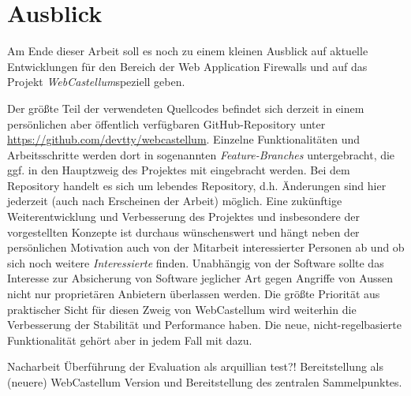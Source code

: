 


\section{Ausblick}

Am Ende dieser Arbeit soll es noch zu einem kleinen Ausblick auf aktuelle Entwicklungen für den Bereich der Web Application Firewalls und auf das Projekt \glqq\emph{WebCastellum}\grqq speziell geben.

Der größte Teil der verwendeten Quellcodes befindet sich derzeit in einem persönlichen aber öffentlich verfügbaren GitHub-Repository unter \url{https://github.com/devtty/webcastellum}. Einzelne Funktionalitäten und Arbeitsschritte werden dort in sogenannten \emph{Feature-Branches} untergebracht, die ggf. in den Hauptzweig des Projektes mit eingebracht werden. Bei dem Repository handelt es sich um lebendes Repository, d.h. Änderungen sind hier jederzeit (auch nach Erscheinen der Arbeit) möglich. Eine zukünftige Weiterentwicklung und Verbesserung des Projektes und insbesondere der vorgestellten Konzepte ist durchaus wünschenswert und hängt neben der persönlichen Motivation auch von der Mitarbeit interessierter Personen ab und ob sich noch weitere \emph{Interessierte} finden. Unabhängig von der Software sollte das Interesse zur Absicherung von Software jeglicher Art gegen Angriffe von Aussen nicht nur proprietären Anbietern überlassen werden. Die größte Priorität aus praktischer Sicht für diesen Zweig von WebCastellum wird weiterhin die Verbesserung der Stabilität und Performance haben. Die neue, nicht-regelbasierte Funktionalität gehört aber in jedem Fall mit dazu.


\begin{neu}
  Nacharbeit Überführung der Evaluation als arquillian test?!
  Bereitstellung als (neuere) WebCastellum Version und Bereitstellung des zentralen Sammelpunktes.
\end{neu}
